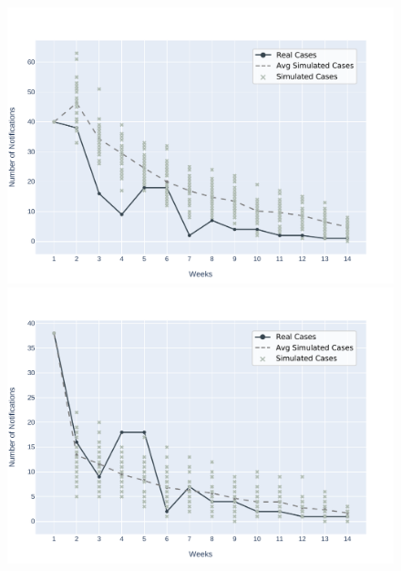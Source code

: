 \begin{figure}[!ht]
\begin{minipage}[c]{.45\textwidth}
        \includegraphics[scale=0.4]{images/experiments-as/AS-2017-01-22.pdf}
      \end{minipage}
      \hspace{0.5cm}
      \begin{minipage}[c]{.45\textwidth}
          \centering
          \includegraphics[scale=0.4]{images/experiments-as/AS-2017-01-29.pdf}
    \end{minipage}
    \\
    \begin{minipage}[c]{.45\textwidth}
        \centering

\end{minipage}
\end{figure}
